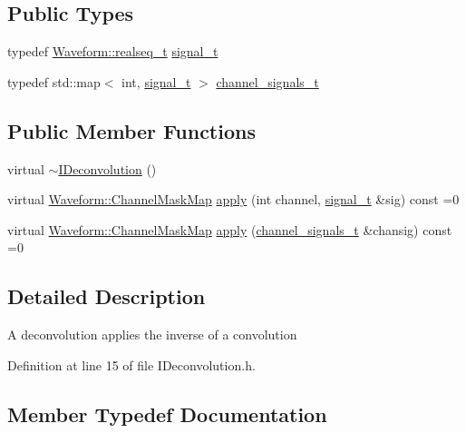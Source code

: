 \subsection*{Public Types}
\begin{DoxyCompactItemize}
\item 
typedef \hyperlink{namespace_wire_cell_1_1_waveform_a479175e541c8545e87cd8063b74b6956}{Waveform\+::realseq\+\_\+t} \hyperlink{class_wire_cell_1_1_i_deconvolution_a8b4391e337dad4e658a33b1a6ee3dab5}{signal\+\_\+t}
\item 
typedef std\+::map$<$ int, \hyperlink{class_wire_cell_1_1_i_deconvolution_a8b4391e337dad4e658a33b1a6ee3dab5}{signal\+\_\+t} $>$ \hyperlink{class_wire_cell_1_1_i_deconvolution_a02ef33d767e273c9fbb9a1b27dc84f77}{channel\+\_\+signals\+\_\+t}
\end{DoxyCompactItemize}
\subsection*{Public Member Functions}
\begin{DoxyCompactItemize}
\item 
virtual \hyperlink{class_wire_cell_1_1_i_deconvolution_a9efd63e0381091260709ac8bc191b15d}{$\sim$\+I\+Deconvolution} ()
\item 
virtual \hyperlink{namespace_wire_cell_1_1_waveform_a18b9ae61c858e340252ba3ac83ac3bc0}{Waveform\+::\+Channel\+Mask\+Map} \hyperlink{class_wire_cell_1_1_i_deconvolution_af13ec8cf283e1c21da9530329060565f}{apply} (int channel, \hyperlink{class_wire_cell_1_1_i_deconvolution_a8b4391e337dad4e658a33b1a6ee3dab5}{signal\+\_\+t} \&sig) const =0
\item 
virtual \hyperlink{namespace_wire_cell_1_1_waveform_a18b9ae61c858e340252ba3ac83ac3bc0}{Waveform\+::\+Channel\+Mask\+Map} \hyperlink{class_wire_cell_1_1_i_deconvolution_a4c8f7f0aecfa099a75f43d1bc3ec1c7f}{apply} (\hyperlink{class_wire_cell_1_1_i_deconvolution_a02ef33d767e273c9fbb9a1b27dc84f77}{channel\+\_\+signals\+\_\+t} \&chansig) const =0
\end{DoxyCompactItemize}


\subsection{Detailed Description}
A deconvolution applies the inverse of a convolution 

Definition at line 15 of file I\+Deconvolution.\+h.



\subsection{Member Typedef Documentation}
\mbox{\label{class_wire_cell_1_1_i_deconvolution_a02ef33d767e273c9fbb9a1b27dc84f77}} 
